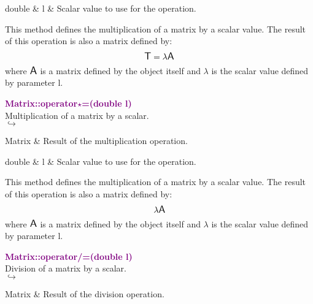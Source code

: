 \begin{tcolorbox}[width=\textwidth,myArgs,tabularx={ll|R}]
double & l & Scalar value to use for the operation.
\end{tcolorbox}

This method defines the multiplication of a matrix by a scalar value.
The result of this operation is also a matrix defined by:
\begin{equation*}
\mbox{\large\ensuremath{\mathsf{T}}} = \lambda \mbox{\large\ensuremath{\mathsf{A}}}
\end{equation*}
where $\mbox{\large\ensuremath{\mathsf{A}}}$ is a matrix defined by the object itself and $\lambda$ is the scalar value defined by parameter l.

\textcolor{purple}{\textbf{Matrix::operator$\star$=(double l)}}\label{Matrix::operator*=(double l)}\\
Multiplication of a matrix by a scalar.\\ \hspace*{5mm}$\hookrightarrow$
\vspace*{-2em}\begin{tcolorbox}[grow to left by=-1cm, width=\textwidth-1cm,myArgs,tabularx={l|R}]
Matrix & Result of the multiplication operation.
\end{tcolorbox}

\begin{tcolorbox}[width=\textwidth,myArgs,tabularx={ll|R}]
double & l & Scalar value to use for the operation.
\end{tcolorbox}

This method defines the multiplication of a matrix by a scalar value.
The result of this operation is also a matrix defined by:
\begin{equation*}
\lambda \mbox{\large\ensuremath{\mathsf{A}}}
\end{equation*}
where $\mbox{\large\ensuremath{\mathsf{A}}}$ is a matrix defined by the object itself and $\lambda$ is the scalar value defined by parameter l.

\textcolor{purple}{\textbf{Matrix::operator/=(double l)}}\label{Matrix::operator/=(double l)}\\
Division of a matrix by a scalar.\\ \hspace*{5mm}$\hookrightarrow$
\vspace*{-2em}\begin{tcolorbox}[grow to left by=-1cm, width=\textwidth-1cm,myArgs,tabularx={l|R}]
Matrix & Result of the division operation.
\end{tcolorbox}

